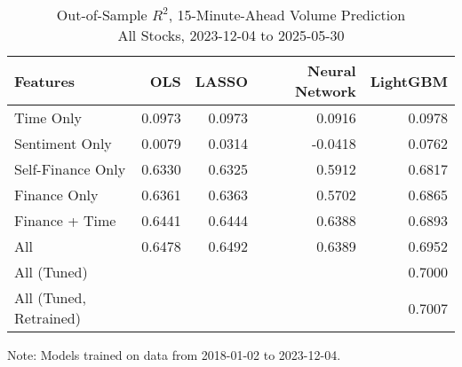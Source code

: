 \begin{table}[H]
\caption{
{ Out-of-Sample $R^2$, 15-Minute-Ahead Volume Prediction} \\
{\small All Stocks, 2023-12-04 to 2025-05-30}
} 

\fontsize{12.0pt}{14.4pt}\selectfont

\begin{tabular*}{\linewidth}{@{\extracolsep{\fill}}lrrrr}
\toprule
Features & OLS & LASSO & Neural Network & LightGBM \\ 
\midrule\addlinespace[2.5pt]
Time Only & 0.0973 & 0.0973 & 0.0916 & 0.0978 \\
Sentiment Only & 0.0079 & 0.0314 & -0.0418 & 0.0762 \\
Self-Finance Only & 0.6330 & 0.6325 & 0.5912 & 0.6817 \\
Finance Only & 0.6361 & 0.6363 & 0.5702 & 0.6865 \\
Finance + Time & 0.6441 & 0.6444 & 0.6388 & 0.6893 \\
All & 0.6478 & 0.6492 & 0.6389 & 0.6952 \\
All (Tuned) &  &  &  & 0.7000 \\
All (Tuned, Retrained) &  &  &  & 0.7007 \\
\bottomrule
\end{tabular*}
\begin{minipage}{\linewidth}
Note: Models trained on data from 2018-01-02 to 2023-12-04.\\
\end{minipage}
\end{table}
